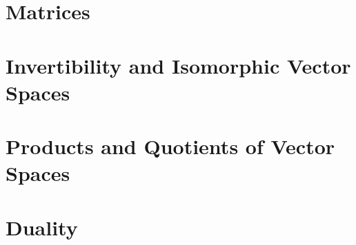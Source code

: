 \section{Matrices}

\section{Invertibility and Isomorphic Vector Spaces}

\section{Products and Quotients of Vector Spaces}

\section{Duality}

